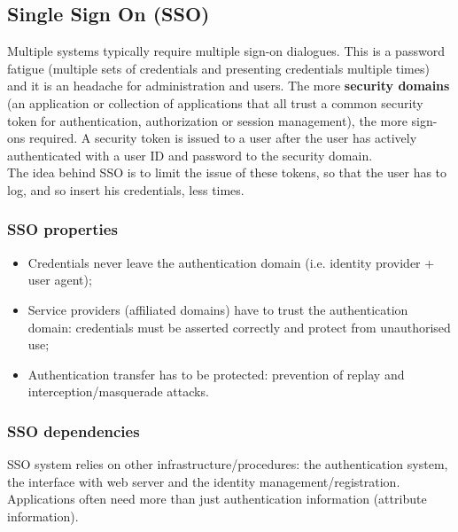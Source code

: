 \documentclass[a4paper, 10pt, titlepage]{article}
\begin{document}
\subsection{Single Sign On (SSO)}
Multiple systems typically require multiple sign-on dialogues. This is a password fatigue (multiple sets of credentials and presenting credentials multiple times) and it is an headache for administration and users. The more \textbf{security domains} (an application or collection of applications that all trust a common security token for authentication, authorization or session management), the more sign-ons required. A security token is issued to a user after the user has actively authenticated with a user ID and password to the security domain. \medskip\\
The idea behind SSO is to limit the issue of these tokens, so that the user has to log, and so insert his credentials, less times.

\subsubsection{SSO properties}
\begin{itemize}
\item Credentials never leave the authentication domain (i.e. identity provider + user agent);
\item Service providers (affiliated domains) have to trust the authentication domain: credentials must be asserted correctly and protect from unauthorised use;
\item Authentication transfer has to be protected: prevention of replay and interception/masquerade attacks.
\end{itemize}

\subsubsection{SSO dependencies}
SSO system relies on other infrastructure/procedures: the authentication system, the interface with web server and the identity management/registration. Applications often need more than just authentication information (attribute information).
\end{document}
